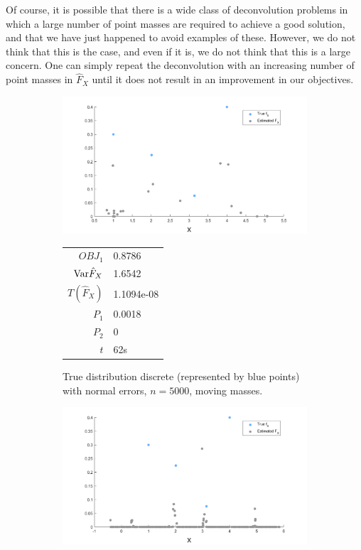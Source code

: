 
Of course, it is possible that there is a wide class of deconvolution problems in which a large number of point masses are required to achieve a good solution, and that we have just happened to avoid examples of these. However, we do not think that this is the case, and even if it is, we do not think that this is a large concern. One can simply repeat the deconvolution with an increasing number of point masses in $\hat{F}_X$ until it does not result in an improvement in our objectives.

\begin{figure}
	\centering
	\begin{subfigure}[b]{0.38\textwidth}
		\centering
		\includegraphics[width = \textwidth]{Figures/Deconvolution/moving_masses_discrete_n5000_example.png}
		\begin{tabular}{r l}
			$OBJ_1$ & 0.8786\\
			$\mathrm{Var} \hat{F}_X$ & 1.6542\\
			$T(\hat{F}_X)$ & 1.1094e-08\\
			$P_1$ & 0.0018\\
			$P_2$ & 0\\
			$t$ & 62s
		\end{tabular}
		\caption{True distribution discrete (represented by blue points) with normal errors, $n = 5000$, moving masses.}
		\label{fig:moving masses discrete}
	\end{subfigure}
	\hfill
	\begin{subfigure}[b]{0.38\textwidth}
		\centering
		\includegraphics[width = \textwidth]{Figures/Deconvolution/fixed_masses_discrete_n5000_example.png}

\end{subfigure}
\end{figure}
